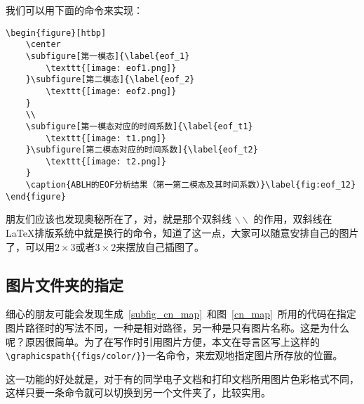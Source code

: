 我们可以用下面的命令来实现：

{
\color{green!50!black}
\begin{lstlisting}[breaklines=true,]
\begin{figure}[htbp]
    \center
    \subfigure[第一模态]{\label{eof_1}
        \texttt{[image: eof1.png]}
    }\subfigure[第二模态]{\label{eof_2}
        \texttt{[image: eof2.png]}
    }
    \\
    \subfigure[第一模态对应的时间系数]{\label{eof_t1}
        \texttt{[image: t1.png]}
    }\subfigure[第二模态对应的时间系数]{\label{eof_t2}
        \texttt{[image: t2.png]}
    }
    \caption{ABLH的EOF分析结果（第一第二模态及其时间系数）}\label{fig:eof_12}
\end{figure}
\end{lstlisting}
}

朋友们应该也发现奥秘所在了，对，就是那个双斜线 $\backslash\backslash$ 的作用，双斜线在\LaTeX 排版系统中就是换行的命令，知道了这一点，大家可以随意安排自己的图片了，可以用$2\times 3$或者$3\times 2$来摆放自己插图了。

\subsection{图片文件夹的指定}

细心的朋友可能会发现生成~\ref{subfig_cn_map}~和图~\ref{cn_map}~所用的代码在指定图片路径时的写法不同，一种是相对路径，另一种是只有图片名称。这是为什么呢？原因很简单。为了在写作时引用图片方便，本文在导言区写上这样的\verb|\graphicspath{{figs/color/}}|一名命令，来宏观地指定图片所存放的位置。

这一功能的好处就是，对于有的同学电子文档和打印文档所用图片色彩格式不同，这样只要一条命令就可以切换到另一个文件夹了，比较实用。
